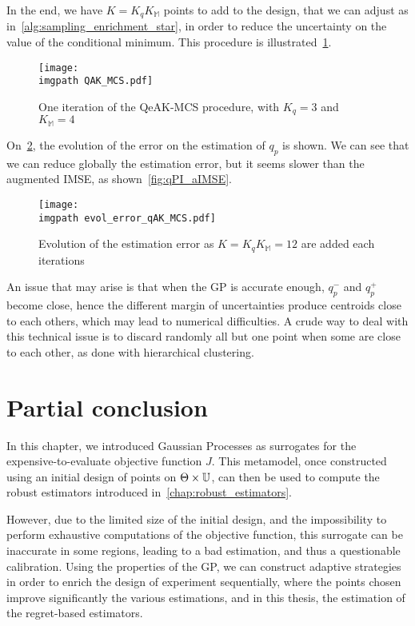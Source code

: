\documentclass[../../Main_ManuscritThese.tex]{subfiles}
\newcommand\imgpath{/home/victor/acadwriting/Manuscrit/Text/Chapter4/img/}
\begin{document}
In the end, we have $K = K_qK_{\mathbb{M}}$ points to add to the
design, that we can adjust as in~\cref{alg:sampling_enrichment_star},
in order to reduce the uncertainty on the value of the conditional
minimum. This procedure is illustrated~\cref{fig:QAK_MCS}.
\begin{figure}[ht]
  \centering
  \texttt{[image: \\imgpath QAK\_MCS.pdf]}
  \caption{\label{fig:QAK_MCS} One iteration of the QeAK-MCS procedure, with $K_q=3$ and $K_{\mathbb{M}}=4$}
\end{figure}
On~\cref{fig:evol_error_qAK_MCS}, the evolution of the error on the
estimation of $q_p$ is shown. We can see that we can reduce globally
the estimation error, but it seems slower than the augmented IMSE, as
shown~\cref{fig:qPI_aIMSE}.
\begin{figure}[ht]
  \centering
  \texttt{[image: \\imgpath evol\_error\_qAK\_MCS.pdf]}
  \caption{\label{fig:evol_error_qAK_MCS} Evolution of the estimation
    error as $K=K_qK_{\mathbb{M}}=12$ are added each iterations}
\end{figure}

An issue that may arise is that when the GP is accurate enough,
$q_p^-$ and $q_p^+$ become close, hence the different margin of
uncertainties produce centroids close to each others, which may lead
to numerical difficulties. A crude way to deal with this technical
issue is to discard randomly all but one point when some are close to
each other, as done with hierarchical clustering.

\section{Partial conclusion}

In this chapter, we introduced Gaussian Processes as surrogates for
the expensive-to-evaluate objective function $J$. This metamodel, once
constructed using an initial design of points on
$\Theta \times \mathbb{U}$, can then be used to compute the robust
estimators introduced in~\cref{chap:robust_estimators}.

However, due to the limited size of the initial design, and the
impossibility to perform exhaustive computations of the objective
function, this surrogate can be inaccurate in some regions, leading to
a bad estimation, and thus a questionable calibration.  Using the
properties of the GP, we can construct adaptive strategies in order
to enrich the design of experiment sequentially, where the points
chosen improve significantly the various estimations, and in this
thesis, the estimation of the regret-based estimators.
\end{document}
